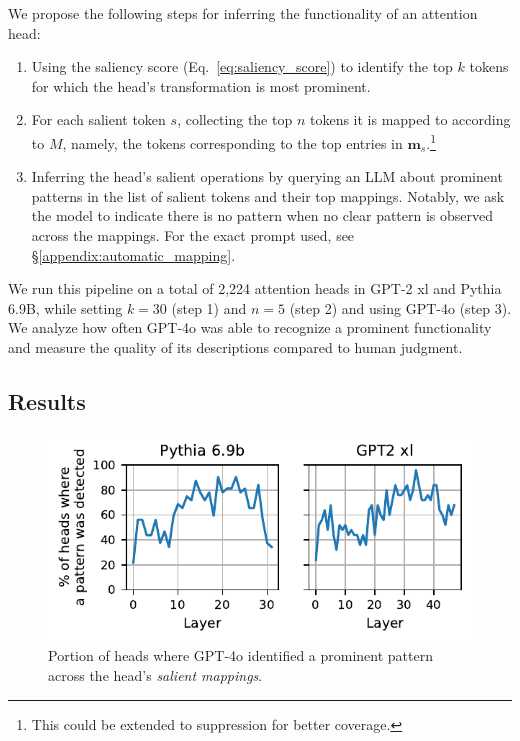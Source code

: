 \documentclass[11pt]{article}
\newcommand{\PythiaSevenB}{Pythia 6.9B}
\newcommand{\GPTxl}{GPT-2 xl}
\newcommand{\GPTFourO}{GPT-4o}
\begin{document}
We propose the following steps for inferring the functionality of an attention head:
\begin{enumerate}
[wide, labelindent=0pt, topsep=2pt, itemsep=0pt]
    \item Using the saliency score (Eq.~\ref{eq:saliency_score}) to identify the top $k$ tokens for which the head's transformation is most prominent.
    
    \item For each salient token $s$, collecting the top $n$ tokens it is mapped to according to $M$, namely, the tokens corresponding to the top entries in $\mathbf{m}_s$.\footnote{This could be extended to suppression for better coverage.}
    
    \item Inferring the head's salient operations by querying an LLM about prominent patterns in the list of salient tokens and their top mappings. Notably, we ask the model to indicate there is no pattern when no clear pattern is observed across the mappings. For the exact prompt used, see \S\ref{appendix:automatic_mapping}.
\end{enumerate}

We run this pipeline on a total of 2,224 attention heads in {\GPTxl} and {\PythiaSevenB}, while setting $k=30$ (step 1) and $n=5$ (step 2) and using {\GPTFourO} \citep{hurst2024gpt} (step 3). 
We analyze how often \GPTFourO{} was able to recognize a prominent functionality and measure the quality of its descriptions compared to human judgment.


\subsection{Results}
\label{subsec:salient_results}

\begin{figure}[t]
    \centering
    \includegraphics[scale=0.65]
    {figures/identification_rate.pdf}
    \caption{Portion of heads where {\GPTFourO} identified a prominent pattern across the head's \emph{salient mappings}.}
    \label{fig:identification_rate}
\end{figure}
\end{document}
